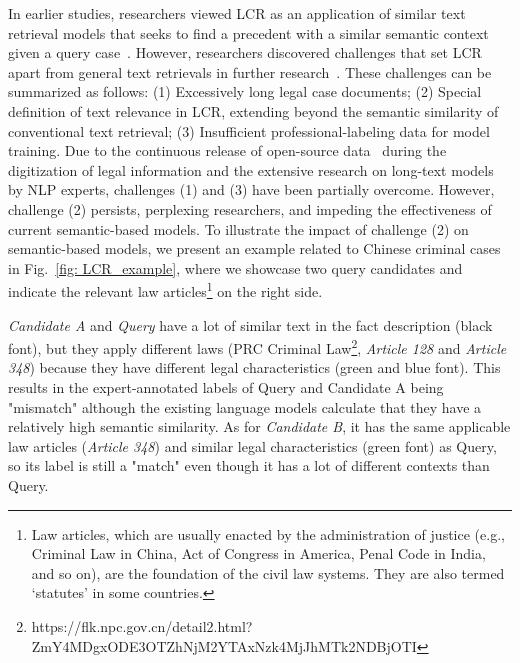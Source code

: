 In earlier studies, researchers viewed LCR as an application of similar text retrieval models that seeks to find a precedent with a similar semantic context given a query case~\cite{xiao2021Lawformer,bhattacharya2020LCR_survey,saravanan2009LCR_1,zeng2005LCR_2,zhaochun2024answer}.
However, researchers discovered challenges that set LCR apart from general text retrievals in further research~\cite {shao2020Bert_PLI,hu2022Bert_LF}.
These challenges can be summarized as follows: (1) Excessively long legal case documents; (2) Special definition of text relevance in LCR, extending beyond the semantic similarity of conventional text retrieval; (3) Insufficient professional-labeling data for model training.
Due to the continuous release of open-source data~\cite{ma2021LeCaRD,yu2022Explainable,xiao2018CAIL2018} during the digitization of legal information and the extensive research on long-text models~\cite{Yang@Transformer_XL, NEURIPS@XL_Net, arxiv@Longformer} by NLP experts, challenges (1) and (3) have been partially overcome. 
However, challenge (2) persists, perplexing researchers, and impeding the effectiveness of current semantic-based models.
To illustrate the impact of challenge (2) on semantic-based models, we present an example related to Chinese criminal cases in Fig.~\ref{fig: LCR_example}, where we showcase two query candidates and indicate the relevant law articles\footnote{Law articles, which are usually enacted by the administration of justice (e.g., Criminal Law in China,  Act of Congress in America, Penal Code in India, and so on), are the foundation of the civil law systems. They are also termed ‘statutes’ in some countries.} on the right side. %
\begin{example}{
\emph{Candidate A} and \emph{Query} have a lot of similar text in the fact description (black font), but they apply different laws (PRC Criminal Law\footnote{https://flk.npc.gov.cn/detail2.html?ZmY4MDgxODE3OTZhNjM2YTAxNzk4MjJhMTk2NDBjOTI}, \emph{Article 128} and \emph{Article 348}) because they have different legal characteristics (green and blue font). This results in the expert-annotated labels of Query and Candidate A being "mismatch" although the existing language models calculate that they have a relatively high semantic similarity.
As for \emph{Candidate B}, it has the same applicable law articles (\emph{Article 348}) and similar legal characteristics (green font) as Query, so its label is still a "match" even though it has a lot of different contexts than Query.
}
\end{example}

